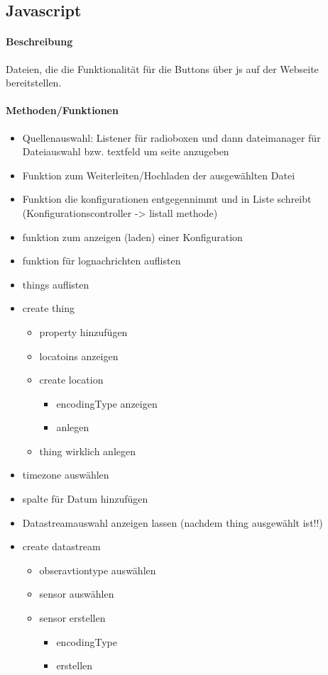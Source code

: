 \subsection{Javascript}

\paragraph{Beschreibung}
Dateien, die die Funktionalität für die Buttons über js auf der Webseite bereitstellen.

\paragraph{Methoden/Funktionen}
\begin{itemize}
\item Quellenauswahl: Listener für radioboxen und dann dateimanager für Dateiauswahl bzw. textfeld um seite anzugeben
\item Funktion zum Weiterleiten/Hochladen der ausgewählten Datei
\item Funktion die konfigurationen entgegennimmt und in Liste schreibt (Konfigurationscontroller -> listall methode)
\item funktion zum anzeigen (laden) einer Konfiguration
\item funktion für lognachrichten auflisten

\item things auflisten
\item create thing 
\begin{itemize}
\item property hinzufügen
\item locatoins anzeigen
\item create location
\begin{itemize}
\item encodingType anzeigen
\item anlegen
\end{itemize}
\item thing wirklich anlegen
\end{itemize}


\item timezone auswählen
\item spalte für Datum hinzufügen
\item Datastreamauswahl anzeigen lassen (nachdem thing ausgewählt ist!!)
\item create datastream
\begin{itemize}
\item obseravtiontype auswählen
\item sensor auswählen
\item sensor erstellen
\begin{itemize}
\item encodingType
\item erstellen
\end{itemize}


\end{itemize}
\end{itemize}
